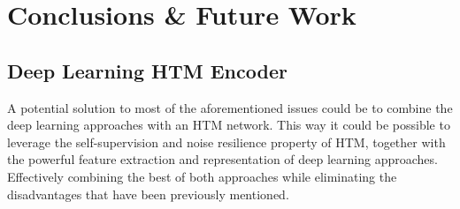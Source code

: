 \chapter{Conclusions \& Future Work}
\section{Deep Learning HTM Encoder}
A potential solution to most of the aforementioned issues could be to combine the deep learning approaches with an HTM network. This way it could be possible to leverage the self-supervision and noise resilience property of HTM, together with the powerful feature extraction and representation of deep learning approaches. Effectively combining the best of both approaches while eliminating the disadvantages that have been previously mentioned.